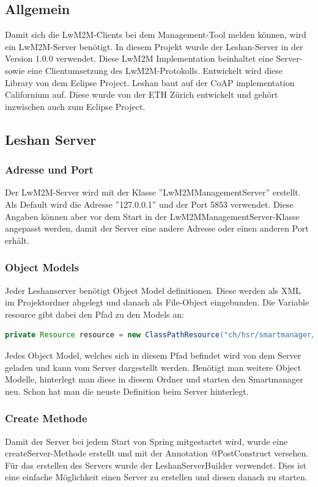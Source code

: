 \subsection{Allgemein}
Damit sich die LwM2M-Clients bei dem Management-Tool melden können, wird ein LwM2M-Server benötigt. In diesem Projekt wurde der Leshan-Server in der Version 1.0.0 verwendet. Diese LwM2M Implementation beinhaltet eine Server- sowie eine Clientumsetzung des LwM2M-Protokolls. Entwickelt wird diese Library von dem Eclipse Project. Leshan baut auf der CoAP implementation Californium auf. Diese wurde von der ETH Zürich entwickelt und  gehört inzwischen auch zum Eclipse Project.

\subsection{Leshan Server}
\subsubsection{Adresse und Port}
Der LwM2M-Server wird mit der Klasse ''LwM2MManagementServer'' erstellt. Als Default wird die Adresse ''127.0.0.1'' und der Port 5853 verwendet. Diese Angaben können aber vor dem Start in der LwM2MManagementServer-Klasse angepasst werden, damit der Server eine andere Adresse oder einen anderen Port erhält.
\subsubsection{Object Models}
Jeder Leshanserver benötigt Object Model definitionen. Diese werden als XML im Projektordner abgelegt und danach als File-Object eingebunden.
Die Variable resource gibt dabei den Pfad zu den Models an:
\begin{lstlisting}[language=java]
private Resource resource = new ClassPathResource("ch/hsr/smartmanager/resources/models/");
\end{lstlisting}
Jedes Object Model, welches sich in diesem Pfad befindet wird von dem Server geladen und kann vom Server dargestellt werden. Benötigt man weitere Object Modelle, hinterlegt man diese in diesem Ordner und starten den Smartmanager neu. Schon hat man die neuste Definition beim Server hinterlegt.
\newpage

\subsubsection{Create Methode}
Damit der Server bei jedem Start von Spring mitgestartet wird, wurde eine createServer-Methode erstellt und mit der Annotation @PostConstruct versehen. Für das erstellen des Servers wurde der LeshanServerBuilder verwendet. Dies ist eine einfache Möglichkeit einen Server zu erstellen und diesen danach zu starten.

